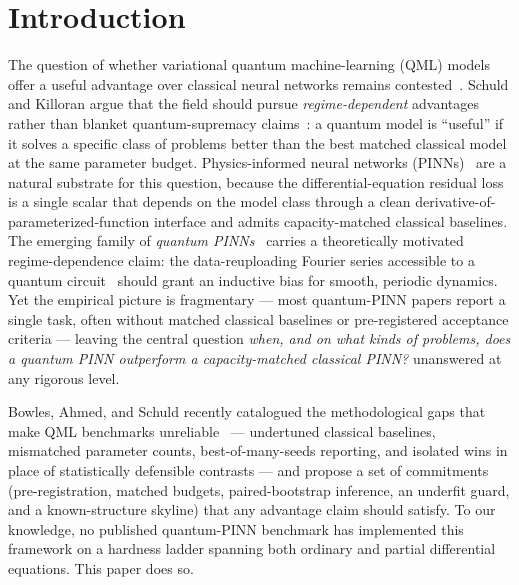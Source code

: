 
\section{Introduction}
\label{sec:intro}

The question of whether variational quantum machine-learning (QML)
models offer a useful advantage over classical neural networks
remains contested~\cite{schuld2019quantum,havlicek2019supervised,
caro2022generalization}. Schuld and Killoran argue that the field
should pursue \emph{regime-dependent} advantages rather than blanket
quantum-supremacy claims~\cite{schuld2022right}: a quantum model is
``useful'' if it solves a specific class of problems better than the
best matched classical model at the same parameter budget.
Physics-informed neural networks (PINNs)~\cite{raissi2019physics,
karniadakis2021physics,lu2021deepxde} are a natural substrate for this
question, because the differential-equation residual loss is a single
scalar that depends on the model class through a clean
derivative-of-parameterized-function interface and admits
capacity-matched classical baselines. The emerging family of
\emph{quantum PINNs}~\cite{perezsalinas2020dataru,kyriienko2021solving,
markidis2022physics,berger2025teqpinn,sedykh2024quantum,
farea2025qcpinn,ahmed2024rfqrc} carries a theoretically motivated
regime-dependence claim: the data-reuploading Fourier series accessible
to a quantum circuit~\cite{schuld2021effect} should grant an inductive
bias for smooth, periodic dynamics. Yet the empirical picture is
fragmentary --- most quantum-PINN papers report a single task, often
without matched classical baselines or pre-registered acceptance
criteria --- leaving the central question \emph{when, and on what kinds
of problems, does a quantum PINN outperform a capacity-matched
classical PINN?} unanswered at any rigorous level.

Bowles, Ahmed, and Schuld recently catalogued the methodological gaps
that make QML benchmarks unreliable~\cite{bowles2024better,
huang2021power} --- undertuned classical baselines, mismatched
parameter counts, best-of-many-seeds reporting, and isolated wins in
place of statistically defensible contrasts --- and propose a set of
commitments (pre-registration, matched budgets, paired-bootstrap
inference, an underfit guard, and a known-structure skyline) that any
advantage claim should satisfy. To our knowledge, no published
quantum-PINN benchmark has implemented this framework on a hardness
ladder spanning both ordinary and partial differential equations. This
paper does so.

